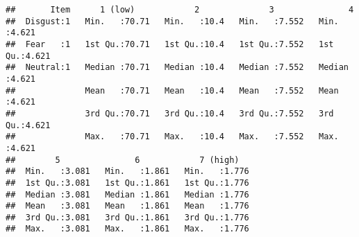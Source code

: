 \documentclass[
]{article}
\newenvironment{Shaded}{\begin{snugshade}}{\end{snugshade}}
\newcommand{\DecValTok}[1]{\textcolor[rgb]{0.00,0.00,0.81}{#1}}
\newcommand{\DocumentationTok}[1]{\textcolor[rgb]{0.56,0.35,0.01}{\textbf{\textit{#1}}}}
\newcommand{\FunctionTok}[1]{\textcolor[rgb]{0.00,0.00,0.00}{#1}}
\newcommand{\NormalTok}[1]{#1}
\newcommand{\OtherTok}[1]{\textcolor[rgb]{0.56,0.35,0.01}{#1}}
\newcommand{\SpecialCharTok}[1]{\textcolor[rgb]{0.00,0.00,0.00}{#1}}
\newcommand{\StringTok}[1]{\textcolor[rgb]{0.31,0.60,0.02}{#1}}
\begin{document}
\begin{Shaded}
\end{Shaded}

\begin{verbatim}
##       Item      1 (low)            2              3               4        
##  Disgust:1   Min.   :70.71   Min.   :10.4   Min.   :7.552   Min.   :4.621  
##  Fear   :1   1st Qu.:70.71   1st Qu.:10.4   1st Qu.:7.552   1st Qu.:4.621  
##  Neutral:1   Median :70.71   Median :10.4   Median :7.552   Median :4.621  
##              Mean   :70.71   Mean   :10.4   Mean   :7.552   Mean   :4.621  
##              3rd Qu.:70.71   3rd Qu.:10.4   3rd Qu.:7.552   3rd Qu.:4.621  
##              Max.   :70.71   Max.   :10.4   Max.   :7.552   Max.   :4.621  
##        5               6            7 (high)    
##  Min.   :3.081   Min.   :1.861   Min.   :1.776  
##  1st Qu.:3.081   1st Qu.:1.861   1st Qu.:1.776  
##  Median :3.081   Median :1.861   Median :1.776  
##  Mean   :3.081   Mean   :1.861   Mean   :1.776  
##  3rd Qu.:3.081   3rd Qu.:1.861   3rd Qu.:1.776  
##  Max.   :3.081   Max.   :1.861   Max.   :1.776
\end{verbatim}
\end{document}
